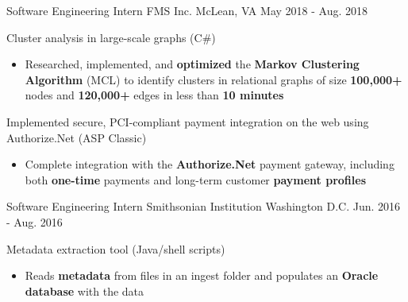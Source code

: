 \begin{cventries}
    \cventry
    {Software Engineering Intern}
	{FMS Inc.}
    {McLean, VA}
    {May 2018 - Aug. 2018}
    {
        \begin{cvitems}
		\item{Cluster analysis in large-scale graphs (C\#)}
			\begin{itemize}
				\item{Researched, implemented, and \textbf{optimized} the \textbf{Markov Clustering Algorithm} (MCL) to identify clusters in relational graphs of size \textbf{100,000+} nodes and \textbf{120,000+} edges in less than \textbf{10 minutes}}
			\end{itemize}
		\item{Implemented secure, PCI-compliant payment integration on the web using Authorize.Net (ASP Classic)}
			\begin{itemize}
				\item{Complete integration with the \textbf{Authorize.Net} payment gateway, including both \textbf{one-time} payments and long-term customer \textbf{payment profiles}}
			\end{itemize}
        \end{cvitems}
    }
    \cventry
    {Software Engineering Intern}
    {Smithsonian Institution}
    {Washington D.C.}
    {Jun. 2016 - Aug. 2016}
    {
        \begin{cvitems}
		\item{Metadata extraction tool (Java/shell scripts)}
        \begin{itemize}
			\item{Reads \textbf{metadata} from files in an ingest folder and populates an \textbf{Oracle database} with the data}

\end{itemize}
\end{cvitems}}
\end{cventries}
